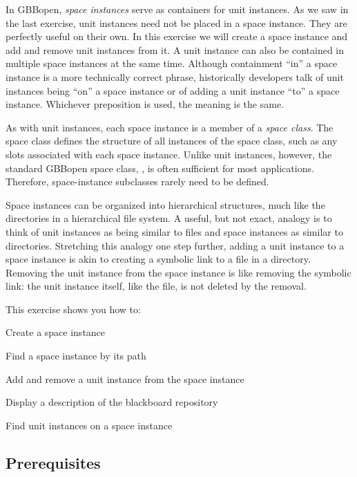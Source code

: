 \documentclass[10pt,twoside,english,pdftex]{article}
\begin{document}
In GBBopen, \textit{space instances} serve as containers for unit instances.
As we saw in the last exercise, unit instances need not be placed in a space
instance.  They are perfectly useful on their own.  In this exercise we will
create a space instance and add and remove unit instances from it.  A unit
instance can also be contained in multiple space instances at the same time.
Although containment ``in'' a space instance is a more technically correct
phrase, historically developers talk of unit instances being ``on'' a space
instance or of adding a unit instance ``to'' a space instance.  Whichever
preposition is used, the meaning is the same.

As with unit instances, each space instance is a member of a \textit{space
  class}.  The space class defines the structure of all instances of the space
class, such as any slots associated with each space instance.  Unlike unit
instances, however, the standard GBBopen space class,
, is often sufficient for most applications.
Therefore, space-instance subclasses rarely need to be defined.

Space instances can be organized into hierarchical structures, much like the
directories in a hierarchical file system.  A useful, but not exact, analogy
is to think of unit instances as being similar to files and space instances as
similar to directories.  Stretching this analogy one step further, adding a
unit instance to a space instance is akin to creating a symbolic link to a
file in a directory.  Removing the unit instance from the space instance is
like removing the symbolic link: the unit instance itself, like the file, is
not deleted by the removal.

\fndocrule

This exercise shows you how to:
\begin{tightitemize}
\item Create a space instance
\item Find a space instance by its path
\item Add and remove a unit instance from the space instance
\item Display a description of the blackboard repository
\item Find unit instances on a space instance
\end{tightitemize}

\fndocrule

\subsection*{Prerequisites}
\end{document}
